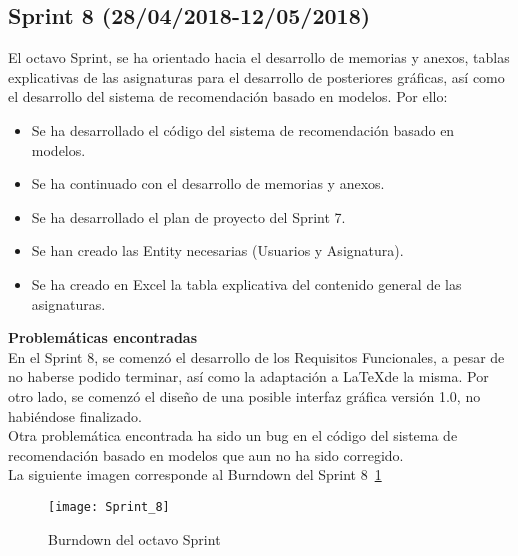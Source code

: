 \subsection{\textbf{Sprint 8} (28/04/2018-12/05/2018) }
El octavo  Sprint, se ha orientado hacia el desarrollo de memorias y anexos, tablas explicativas de las asignaturas para el desarrollo de posteriores gráficas, así como el desarrollo del sistema de recomendación basado en modelos. 
Por ello: 
\begin{itemize}
\item Se ha desarrollado el código del sistema de recomendación basado en modelos. 
\item Se ha continuado con el desarrollo de memorias y anexos. 
\item Se ha desarrollado el plan de proyecto del Sprint 7.
\item Se han creado las Entity necesarias (Usuarios  y Asignatura). 
\item Se ha creado en Excel la tabla explicativa del contenido general de las asignaturas. 
\end{itemize}
\textbf{Problemáticas encontradas}\\En el Sprint 8, se comenzó el desarrollo de los Requisitos Funcionales, a pesar de no haberse podido terminar, así como la adaptación a \LaTeX de la misma. Por otro lado, se comenzó el diseño de una posible interfaz gráfica versión 1.0, no habiéndose finalizado. \\Otra problemática encontrada ha sido un bug en el código del sistema de recomendación basado en modelos que aun no ha sido corregido. 
 \\La siguiente imagen corresponde al Burndown del Sprint 8~\ref{fig:A.2.8}
\begin{figure}[h]
\centering
\texttt{[image: Sprint\_8]}
\caption{Burndown del octavo Sprint}
\label{fig:A.2.8}
\end{figure}
\\
